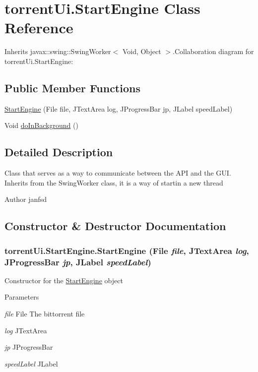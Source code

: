 \hypertarget{classtorrent_ui_1_1_start_engine}{
\section{torrentUi.StartEngine Class Reference}
\label{classtorrent_ui_1_1_start_engine}
}


Inherits javax::swing::SwingWorker$<$ Void, Object $>$.Collaboration diagram for torrentUi.StartEngine:\subsection*{Public Member Functions}
\begin{DoxyCompactItemize}
\item 
\hyperlink{classtorrent_ui_1_1_start_engine_a362cb565cfcea58a1b8015afac21a627}{StartEngine} (File file, JTextArea log, JProgressBar jp, JLabel speedLabel)
\item 
Void \hyperlink{classtorrent_ui_1_1_start_engine_a6d3497aa83b900175fd74f5c6a022e9a}{doInBackground} ()
\end{DoxyCompactItemize}


\subsection{Detailed Description}
Class that serves as a way to communicate between the API and the GUI. Inherits from the SwingWorker class, it is a way of startin a new thread \begin{DoxyAuthor}{Author}
janfsd 
\end{DoxyAuthor}


\subsection{Constructor \& Destructor Documentation}
\hypertarget{classtorrent_ui_1_1_start_engine_a362cb565cfcea58a1b8015afac21a627}{
\subsubsection[{StartEngine}]{\setlength{\rightskip}{0pt plus 5cm}torrentUi.StartEngine.StartEngine (File {\em file}, \/  JTextArea {\em log}, \/  JProgressBar {\em jp}, \/  JLabel {\em speedLabel})}}
\label{classtorrent_ui_1_1_start_engine_a362cb565cfcea58a1b8015afac21a627}
Constructor for the \hyperlink{classtorrent_ui_1_1_start_engine}{StartEngine} object 
\begin{DoxyParams}{Parameters}
\item[{\em file}]File The bittorrent file \item[{\em log}]JTextArea \item[{\em jp}]JProgressBar \item[{\em speedLabel}]JLabel \end{DoxyParams}


